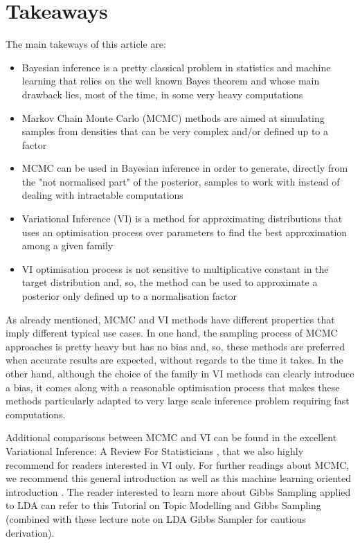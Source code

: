 \section{Takeaways}

The main takeways of this article are:
\begin{itemize}
    \item Bayesian inference is a pretty classical problem in statistics and machine learning that relies on the well known Bayes theorem and whose main drawback lies, most of the time, in some very heavy computations
    \item Markov Chain Monte Carlo (MCMC) methods are aimed at simulating samples from densities that can be very complex and/or defined up to a factor
    \item MCMC can be used in Bayesian inference in order to generate, directly from the "not normalised part" of the posterior, samples to work with instead of dealing with intractable computations
    \item Variational Inference (VI) is a method for approximating distributions that uses an optimisation process over parameters to find the best approximation among a given family
    \item VI optimisation process is not sensitive to multiplicative constant in the target distribution and, so, the method can be used to approximate a posterior only defined up to a normalisation factor
\end{itemize}
    

As already mentioned, MCMC and VI methods have different properties that imply different typical use cases. In one hand, the sampling process of MCMC approaches is pretty heavy but has no bias and, so, these methods are preferred when accurate results are expected, without regards to the time it takes. In the other hand, although the choice of the family in VI methods can clearly introduce a bias, it comes along with a reasonable optimisation process that makes these methods particularly adapted to very large scale inference problem requiring fast computations.

Additional comparisons between MCMC and VI can be found in the excellent Variational Inference: A Review For Statisticians \cite{BleiVariational2017}, that we also highly recommend for readers interested in VI only. For further readings about MCMC, we recommend this general introduction \cite{BrooksHBMonteCarlo2011} as well as this machine learning oriented introduction \cite{Andrieu2003}. The reader interested to learn more about Gibbs Sampling applied to LDA can refer to this Tutorial \cite{Darling2011ATA} on Topic Modelling and Gibbs Sampling (combined with these lecture note \cite{Mukherjee2014} on LDA Gibbs Sampler for cautious derivation).

